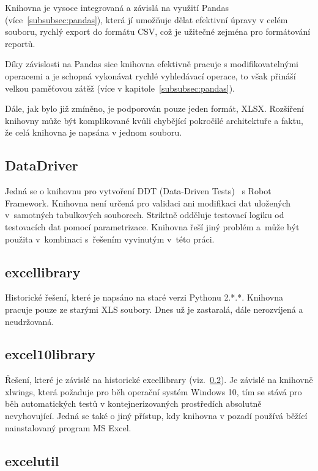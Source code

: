Knihovna je vysoce integrovaná a závislá na využití Pandas (více~\ref{subsubsec:pandas}), která jí umožňuje dělat efektivní úpravy v celém souboru, rychlý export do formátu CSV, což je užitečné zejména pro formátování reportů.

Díky závislosti na Pandas sice knihovna efektivně pracuje s modifikovatelnými operacemi a je schopná vykonávat rychlé vyhledávací operace, to však přináší velkou paměťovou zátěž (více v kapitole~\ref{subsubsec:pandas}).

Dále, jak bylo již zmíněno, je podporován pouze jeden formát, XLSX. Rozšíření knihovny může být komplikované kvůli chybějící pokročilé architektuře a faktu, že celá knihovna je napsána v jednom souboru.

\subsection{DataDriver}

Jedná se o knihovnu pro vytvoření DDT (Data-Driven Tests)~\cite{DataDriver} s Robot Framework. Knihovna není určená pro validaci ani modifikaci dat uložených v~samotných tabulkových souborech. Striktně odděluje testovací logiku od testovacích dat pomocí parametrizace. Knihovna řeší jiný problém a~může být použita v~kombinaci s~řešením vyvinutým v~této práci.

\subsection{excellibrary}
\label{subsec:excellibrary}

Historické řešení, které je napsáno na staré verzi Pythonu 2.*.*. Knihovna pracuje pouze ze starými XLS soubory. Dnes už je zastaralá, dále nerozvíjená a neudržovaná.~\cite{excellibrary}

\subsection{excel10library}

Řešení, které je závislé na historické excellibrary (viz.~\ref{subsec:excellibrary}). Je závislé na knihovně xlwings, která požaduje pro běh operační systém Windows 10, tím se stává pro běh automatických testů v kontejnerizovaných prostředích absolutně nevyhovující. Jedná se také o jiný přístup, kdy knihovna v pozadí používá běžící nainstalovaný program MS Excel.~\cite{excel10library}

\subsection{excelutil}

